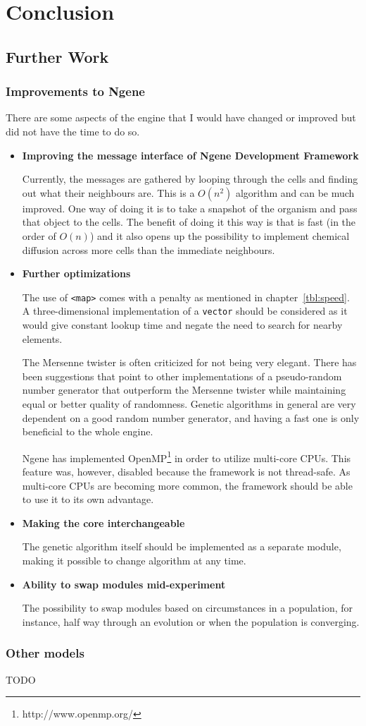 \section{Conclusion}

\subsection{Further Work}

\subsubsection{Improvements to Ngene}
\label{sec:improvements}
There are some aspects of the engine that I would have changed or improved but did not have the time to do so.

\begin{itemize}
	\item\textbf{Improving the message interface of Ngene Development Framework}

	Currently, the messages are gathered by looping through the cells and finding out what their neighbours are. This is a $O(n^{2})$ algorithm and can be much improved. One way of doing it is to take a snapshot of the organism and pass that object to the cells. The benefit of doing it this way is that is fast (in the order of $O(n)$) and it also opens up the possibility to implement chemical diffusion across more cells than the immediate neighbours.

	\item\textbf{Further optimizations}

	The use of \texttt{<map>} comes with a penalty as mentioned in chapter~\ref{tbl:speed}. A three-dimensional implementation of a \texttt{vector} should be considered as it would give constant lookup time and negate the need to search for nearby elements.

	The Mersenne twister is often criticized for not being very elegant. There has been suggestions that point to other implementations of a pseudo-random number generator that outperform the Mersenne twister while maintaining equal or better quality of randomness. Genetic algorithms in general are very dependent on a good random number generator, and having a fast one is only beneficial to the whole engine.

	Ngene has implemented OpenMP\footnote{http://www.openmp.org/} in order to utilize multi-core CPUs. This feature was, however, disabled because the framework is not thread-safe. As multi-core CPUs are becoming more common, the framework should be able to use it to its own advantage.

	\item\textbf{Making the core interchangeable}

	The genetic algorithm itself should be implemented as a separate module, making it possible to change algorithm at any time.

	\item\textbf{Ability to swap modules mid-experiment}

	The possibility to swap modules based on circumstances in a population, for instance, half way through an evolution or when the population is converging.
\end{itemize}

\subsubsection{Other models}

TODO

